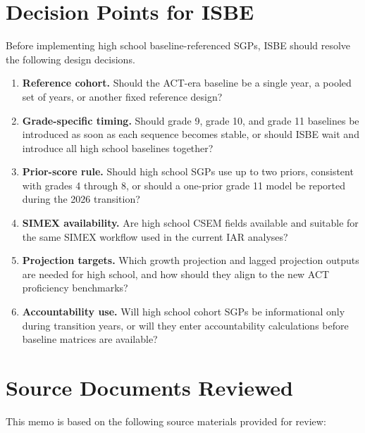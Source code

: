\documentclass[11pt]{article}
\begin{document}
\section{Decision Points for ISBE}

Before implementing high school baseline-referenced SGPs, ISBE should resolve the following design decisions.

\begin{enumerate}
\item \textbf{Reference cohort.} Should the ACT-era baseline be a single year, a pooled set of years, or another fixed reference design?
\item \textbf{Grade-specific timing.} Should grade 9, grade 10, and grade 11 baselines be introduced as soon as each sequence becomes stable, or should ISBE wait and introduce all high school baselines together?
\item \textbf{Prior-score rule.} Should high school SGPs use up to two priors, consistent with grades 4 through 8, or should a one-prior grade 11 model be reported during the 2026 transition?
\item \textbf{SIMEX availability.} Are high school CSEM fields available and suitable for the same SIMEX workflow used in the current IAR analyses?
\item \textbf{Projection targets.} Which growth projection and lagged projection outputs are needed for high school, and how should they align to the new ACT proficiency benchmarks?
\item \textbf{Accountability use.} Will high school cohort SGPs be informational only during transition years, or will they enter accountability calculations before baseline matrices are available?
\end{enumerate}


\section{Source Documents Reviewed}

This memo is based on the following source materials provided for review:
\end{document}
